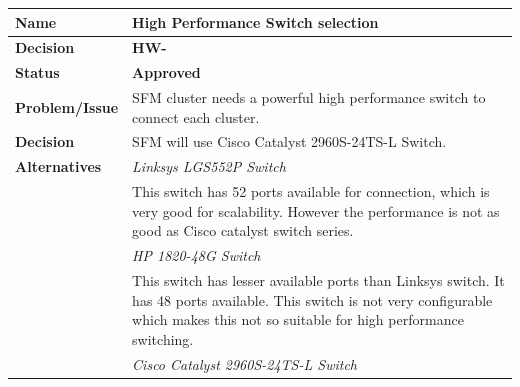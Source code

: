 \begin{table}[h!]
\begin{tabular}{L{0.2\textwidth} L{0.6\textwidth}}
    \textbf{Name}           & \textbf{High Performance Switch selection} \\ \toprule
    \textbf{Decision}       & \textbf{HW-\textbf{}}\\ \midrule
    \textbf{Status}         & \textbf{Approved} \\ \midrule
    \textbf{Problem/Issue}  & SFM cluster needs a powerful high performance switch to connect each cluster. \\ \midrule
    \textbf{Decision}       & SFM will use Cisco Catalyst 2960S-24TS-L Switch.\\ \midrule
    \textbf{Alternatives}   & \textit{Linksys LGS552P Switch}\\
                            & This switch has 52 ports available for connection, which is very good for scalability. However the performance is not as good as Cisco catalyst switch series.\\
                            & \textit{HP 1820-48G Switch}\\
                            & This switch has lesser available ports than Linksys switch. It has 48 ports available. This switch is not very configurable which makes this not so suitable for high performance switching. \\
                            & \textit{Cisco Catalyst 2960S-24TS-L Switch} \\

\end{tabular}
\end{table}
